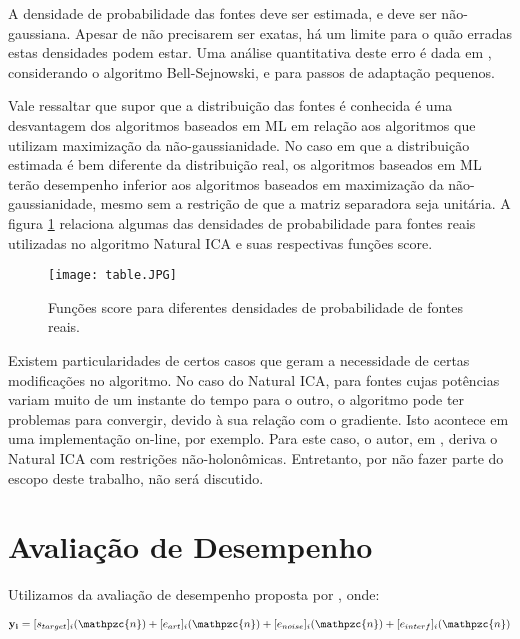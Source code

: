     A densidade de probabilidade das fontes deve ser estimada, e deve ser não-gaussiana. Apesar de não precisarem ser exatas, há um limite para o quão erradas estas densidades podem estar. Uma análise quantitativa deste erro é dada em \cite{ICA3}, considerando o algoritmo Bell-Sejnowski, e para passos de adaptação pequenos.
    
    Vale ressaltar que supor que a distribuição das fontes é conhecida é uma desvantagem dos algoritmos baseados em ML em relação aos algoritmos que utilizam maximização da não-gaussianidade. No caso em que a distribuição estimada é bem diferente da distribuição real, os algoritmos baseados em ML terão desempenho inferior aos algoritmos baseados em maximização da não-gaussianidade, mesmo sem a restrição de que a matriz separadora seja unitária. A figura \ref{fig:score2} relaciona algumas das densidades de probabilidade para fontes reais utilizadas no algoritmo Natural ICA e suas respectivas funções score.
    
    \begin{figure}\label{fig:score2}
        \centering
        \texttt{[image: table.JPG]}
        \caption{Funções score para diferentes densidades de probabilidade de fontes reais.}
    \end{figure}
    
    Existem particularidades de certos casos que geram a necessidade de certas modificações no algoritmo. No caso do Natural ICA, para fontes cujas potências variam muito de um instante do tempo para o outro, o algoritmo pode ter problemas para convergir, devido à sua relação com o gradiente. Isto acontece em uma implementação on-line, por exemplo. Para este caso, o autor, em \cite{holonomic}, deriva o Natural ICA com restrições não-holonômicas. Entretanto, por não fazer parte do escopo deste trabalho, não será discutido.


\section{Avaliação de Desempenho}
    Utilizamos da avaliação de desempenho proposta por \cite{performance}, onde:
    
    \begin{equation}
         \mathbf{y_i} = [s_{target}]_i(\mathpzc{n})  + [e_{art}]_i(\mathpzc{n})  +  [e_{noise}]_i(\mathpzc{n}) +  [e_{interf}]_i(\mathpzc{n})
    \end{equation}
    
